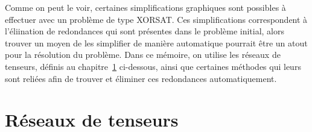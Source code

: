 Comme on peut le voir, certaines simplifications graphiques sont possibles à effectuer avec un problème de type XORSAT.
Ces simplifications correspondent à l'éliination de redondances qui sont présentes dans le problème initial, alors trouver un moyen de les simplifier de manière automatique pourrait être un atout pour la résolution du problème.
Dans ce mémoire, on utilise les réseaux de tenseurs, définis au chapitre~\ref{ch:TN} ci-dessous, ainsi que certaines méthodes qui leurs sont reliées afin de trouver et éliminer ces redondances automatiquement.




\chapter{Réseaux de tenseurs}\label{ch:TN}


